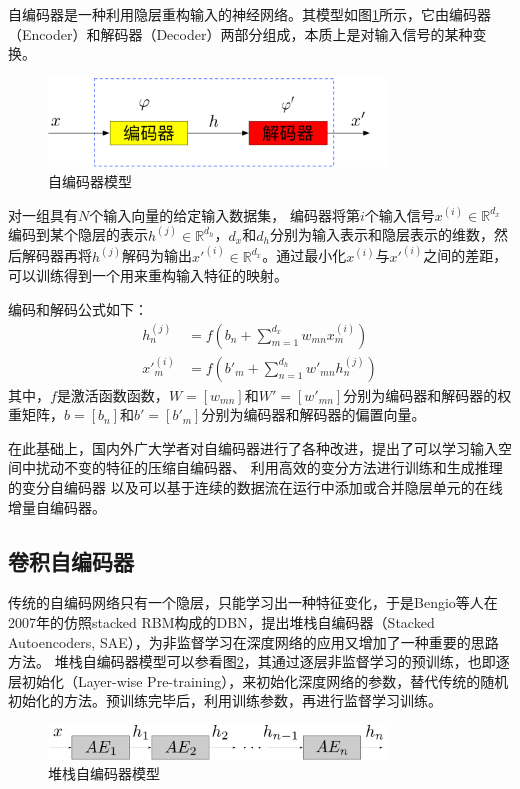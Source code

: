 自编码器是一种利用隐层重构输入的神经网络。其模型如图\ref{fig:ae}所示，它由编码器（Encoder）和解码器（Decoder）两部分组成，本质上是对输入信号的某种变换。
\begin{figure}[hbt]
	\centering
	\includegraphics[width=9cm]{figures/AE/ae}
	\caption{自编码器模型}
	\label{fig:ae}
\end{figure}
对一组具有$N$个输入向量的给定输入数据集，
编码器将第$i$个输入信号$x^{(i)}\in\mathbb{R}^{d_x}$编码到某个隐层的表示$h^{(j)}\in\mathbb{R}^{d_h}$，$d_x$和$d_h$分别为输入表示和隐层表示的维数，然后解码器再将$h^{(j)}$解码为输出$x'^{(i)}\in\mathbb{R}^{d_x}$。通过最小化$x^{(i)}$与$x'^{(i)}$之间的差距，可以训练得到一个用来重构输入特征的映射。

编码和解码公式如下：
\begin{align}
	h^{(j)}_n &= f(b_n+\sum_{m=1}^{d_x}w_{mn}x^{(i)}_m) \\
	x'^{(i)}_m &= f(b'_m+\sum_{n=1}^{d_h}w'_{mn}h^{(j)}_n)
\end{align}
其中，$f$是激活函数函数，${W}=[w_{mn}]$和${W}'=[w'_{mn}]$分别为编码器和解码器的权重矩阵，${b}=[b_n]$和${b'}=[b'_m]$分别为编码器和解码器的偏置向量。

在此基础上，国内外广大学者对自编码器进行了各种改进，提出了可以学习输入空间中扰动不变的特征的压缩自编码器、
利用高效的变分方法进行训练和生成推理的变分自编码器
以及可以基于连续的数据流在运行中添加或合并隐层单元的在线增量自编码器。

\subsection{卷积自编码器}
传统的自编码网络只有一个隐层，只能学习出一种特征变化，于是Bengio等人在2007年的仿照stacked RBM构成的DBN，提出堆栈自编码器（Stacked Autoencoders, SAE），为非监督学习在深度网络的应用又增加了一种重要的思路方法。
堆栈自编码器模型可以参看图\ref{fig:sae}，其通过逐层非监督学习的预训练，也即逐层初始化（Layer-wise Pre-training），来初始化深度网络的参数，替代传统的随机初始化的方法。预训练完毕后，利用训练参数，再进行监督学习训练。

\begin{figure}[hbt]
	\centering
	\includegraphics[width=9cm]{figures/AE/sae}
	\caption{堆栈自编码器模型}
	\label{fig:sae}
\end{figure}


